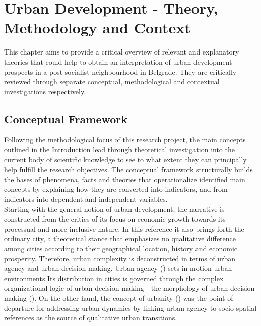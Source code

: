 \documentclass[11pt]{report}
\begin{document}

\chapter{Urban Development - Theory, Methodology and Context}


This chapter aims to provide a critical overview of relevant and explanatory theories that could help to obtain an interpretation of urban development prospects in a post-socialist neighbourhood in Belgrade.
They are critically reviewed through separate conceptual, methodological and contextual investigations respectively.

\section{Conceptual Framework}

Following the methodological focus of this research project, the main concepts outlined in the Introduction lead through theoretical investigation into the current body of scientific knowledge to see to what extent they can principally help fulfill the research objectives. 
The conceptual framework structurally builds the bases of phenomena, facts and theories that operationalize identified main concepts by explaining how they are converted into indicators, and from indicators into dependent and independent variables.
\\

Starting with the general notion of urban development, the narrative is constructed from the critics of its focus on economic growth towards its processual and more inclusive nature.
In this reference it also brings forth the ordinary city, a theoretical stance that emphasizes no qualitative difference among cities according to their geographical location, history and economic prosperity.
Therefore, urban complexity is deconstructed in terms of urban agency and urban decision-making.
Urban agency (\href{ref}{\cite{all ref????}}) sets in motion urban environments
Its distribution in cities is governed through the complex organizational logic of urban decision-making - the morphology of urban decision-making (\href{ref}{\cite{all ref????}}).
On the other hand, the concept of urbanity (\href{ref}{\cite{all ref????}}) was the point of departure for addressing urban dynamics by linking urban agency to socio-spatial references as the source of qualitative urban transitions.
\\
\end{document}

